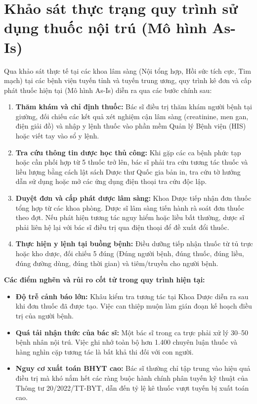 \section{Khảo sát thực trạng quy trình sử dụng thuốc nội trú (Mô hình As-Is)}
\label{sec:clinical_workflow_survey}

Qua khảo sát thực tế tại các khoa lâm sàng (Nội tổng hợp, Hồi sức tích cực, Tim mạch) tại các bệnh viện tuyến tỉnh và tuyến trung ương, quy trình kê đơn và cấp phát thuốc hiện tại (Mô hình As-Is) diễn ra qua các bước chính sau:

\begin{enumerate}[leftmargin=2em]
    \item \textbf{Thăm khám và chỉ định thuốc:} Bác sĩ điều trị thăm khám người bệnh tại giường, đối chiếu các kết quả xét nghiệm cận lâm sàng (creatinine, men gan, điện giải đồ) và nhập y lệnh thuốc vào phần mềm Quản lý Bệnh viện (HIS) hoặc viết tay vào sổ y lệnh.
    \item \textbf{Tra cứu thông tin dược học thủ công:} Khi gặp các ca bệnh phức tạp hoặc cần phối hợp từ 5 thuốc trở lên, bác sĩ phải tra cứu tương tác thuốc và liều lượng bằng cách lật sách Dược thư Quốc gia bản in, tra cứu tờ hướng dẫn sử dụng hoặc mở các ứng dụng điện thoại tra cứu độc lập.
    \item \textbf{Duyệt đơn và cấp phát dược lâm sàng:} Khoa Dược tiếp nhận đơn thuốc tổng hợp từ các khoa phòng. Dược sĩ lâm sàng tiến hành rà soát đơn thuốc theo đợt. Nếu phát hiện tương tác nguy hiểm hoặc liều bất thường, dược sĩ phải liên hệ lại với bác sĩ điều trị qua điện thoại để đề xuất đổi thuốc.
    \item \textbf{Thực hiện y lệnh tại buồng bệnh:} Điều dưỡng tiếp nhận thuốc từ tủ trực hoặc kho dược, đối chiếu 5 đúng (Đúng người bệnh, đúng thuốc, đúng liều, đúng đường dùng, đúng thời gian) và tiêm/truyền cho người bệnh.
\end{enumerate}

\noindent\textbf{Các điểm nghẽn và rủi ro cốt tử trong quy trình hiện tại:}
\begin{itemize}[leftmargin=1.5em]
    \item \textbf{Độ trễ cảnh báo lớn:} Khâu kiểm tra tương tác tại Khoa Dược diễn ra sau khi đơn thuốc đã được tạo. Việc can thiệp muộn làm gián đoạn kế hoạch điều trị của người bệnh.
    \item \textbf{Quá tải nhận thức của bác sĩ:} Một bác sĩ trong ca trực phải xử lý 30--50 bệnh nhân nội trú. Việc ghi nhớ toàn bộ hơn 1.400 chuyên luận thuốc và hàng nghìn cặp tương tác là bất khả thi đối với con người.
    \item \textbf{Nguy cơ xuất toán BHYT cao:} Bác sĩ thường chỉ tập trung vào hiệu quả điều trị mà khó nắm hết các ràng buộc hành chính phân tuyến kỹ thuật của Thông tư 20/2022/TT-BYT, dẫn đến tỷ lệ kê thuốc vượt tuyến bị xuất toán cao.
\end{itemize}
